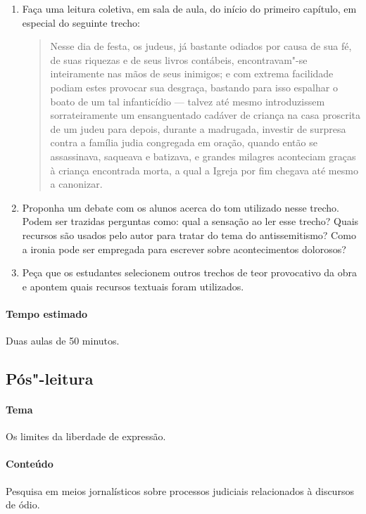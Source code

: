 \documentclass[12pt]{extarticle}
\begin{document}
\begin{enumerate} 


\item Faça uma leitura coletiva, em sala de aula, do início do primeiro capítulo,
em especial do seguinte trecho:

\begin{quote}
Nesse dia de festa, os judeus,
já bastante odiados por causa de sua fé, de suas riquezas e de seus
livros contábeis, encontravam"-se inteiramente nas mãos de seus
inimigos; e com extrema facilidade podiam estes provocar sua desgraça,
bastando para isso espalhar o boato de um tal infanticídio --- talvez até
mesmo introduzissem sorrateiramente um ensanguentado cadáver de criança
na casa proscrita de um judeu para depois, durante a madrugada,
investir de surpresa contra a família judia congregada em oração,
quando então se assassinava, saqueava e batizava, e grandes milagres
aconteciam graças à criança encontrada morta, a qual a Igreja por fim
chegava até mesmo a canonizar.
\end{quote}

\item Proponha um debate com os alunos acerca do tom utilizado nesse trecho. 
Podem ser trazidas perguntas como: qual a sensação ao ler esse trecho?
Quais recursos são usados pelo autor para tratar do tema do antissemitismo?
Como a ironia pode ser empregada para escrever sobre acontecimentos dolorosos?

\item Peça que os estudantes selecionem outros trechos de teor provocativo da obra
e apontem quais recursos textuais foram utilizados.

\end{enumerate}

\paragraph{Tempo estimado} Duas aulas de 50 minutos. 

\subsection{Pós"-leitura}

\paragraph{Tema} Os limites da liberdade de expressão.

\paragraph{Conteúdo} Pesquisa em meios jornalísticos sobre processos judiciais
relacionados à discursos de ódio.
\end{document}
